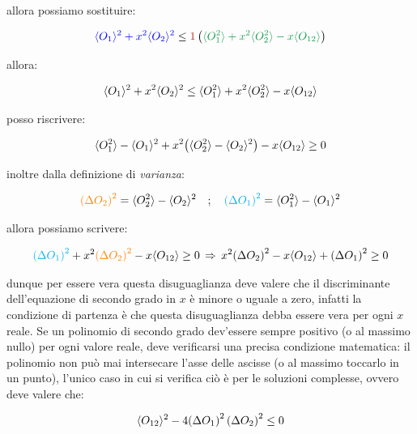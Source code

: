 	allora possiamo sostituire:
	
\begin{align*}
	\textcolor{blue}{ \mean{O_1}^2 + x^2 \mean{O_2}^2 } \leq \textcolor{BrickRed}{1} \, \qty( \textcolor{ForestGreen}{ \mean{O^2_1} + x^2\mean{O_2^2} -x\mean{O_{12}} } ) 
\end{align*}
	
	allora:
	
\begin{align*}
	 \langle O_1 \rangle^2 + x^2 \langle O_2 \rangle^2  \leq \langle O^2_1 \rangle + x^2\langle O_2^2 \rangle -x\langle O_{12} \rangle
\end{align*}

	posso riscrivere:
	
\begin{align*}
	\langle O^2_1 \rangle - \langle O_1 \rangle^2 + x^2\qty(\langle O_2^2 \rangle - \langle O_2 \rangle^2) - x\langle O_{12} \rangle \geq 0
\end{align*}
	
	inoltre dalla definizione di \textit{varianza}: 
	
\begin{align*}
	\textcolor{orange}{\qty(\Delta O_2)^2} = \langle O_2^2 \rangle - \langle O_2 \rangle^2 \quad ; \quad \textcolor{cyan}{ \qty(\Delta O_1)^2 } = \langle O_1^2 \rangle - \langle O_1 \rangle^2
\end{align*}

	allora possiamo scrivere:
	
\begin{align*}
	\textcolor{cyan}{ \qty(\Delta O_1)^2 }  + x^2 \textcolor{orange}{\qty(\Delta O_2)^2} - x\langle O_{12} \rangle \geq 0 \, \Rightarrow \, x^2 \qty(\Delta O_2)^2  - x\langle O_{12} \rangle  +  \qty(\Delta O_1)^2   \geq 0
\end{align*}

	dunque per essere vera questa disuguaglianza deve valere che il discriminante dell'equazione di secondo grado in $x$ è minore o uguale a zero, infatti la condizione di partenza è che questa disuguaglianza debba essere vera per ogni $x$ reale. Se un polinomio di secondo grado dev'essere sempre positivo (o al massimo nullo) per ogni valore reale, deve verificarsi una precisa condizione matematica: il polinomio non può mai intersecare l'asse delle ascisse (o al massimo toccarlo in un punto), l'unico caso in cui si verifica ciò è per le soluzioni complesse, ovvero deve valere che:
	
\begin{align*}
	\langle O_{12} \rangle^2 - 4\qty(\Delta O_1)^2 \, \qty(\Delta O_2)^2 \leq 0
\end{align*}

